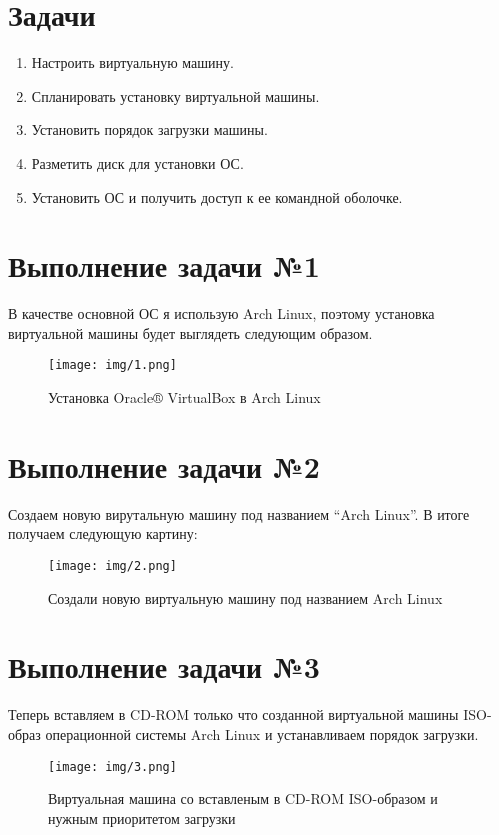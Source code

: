 \documentclass{gost}
\begin{document}
	\gostTitlePage

	\section{Задачи}
		\begin{enumerate}
			\item Настроить виртуальную машину.
			\item Спланировать установку виртуальной машины.
			\item Установить порядок загрузки машины.
			\item Разметить диск для установки ОС.
			\item Установить ОС и получить доступ к ее командной оболочке.
		\end{enumerate}

	\section{Выполнение задачи №1}
		В качестве основной ОС я использую Arch Linux, поэтому установка виртуальной
		машины будет выглядеть следующим образом.

		\begin{figure}[H]
			\texttt{[image: img/1.png]}
			\caption{Установка Oracle® VirtualBox в Arch Linux}
		\end{figure}

	\section{Выполнение задачи №2}
		Создаем новую вирутальную машину под названием \enquote{Arch Linux}. В итоге
		получаем следующую картину:

		\begin{figure}[H]
			\texttt{[image: img/2.png]}
			\caption{Создали новую виртуальную машину под названием Arch Linux}
		\end{figure}

	\section{Выполнение задачи №3}
		Теперь вставляем в CD-ROM только что созданной виртуальной машины ISO-образ
		операционной системы Arch Linux и устанавливаем порядок загрузки.

		\begin{figure}[H]
			\texttt{[image: img/3.png]}
			\caption{Виртуальная машина со вставленым в CD-ROM ISO-образом и нужным
			приоритетом загрузки}
		\end{figure}
\end{document}
